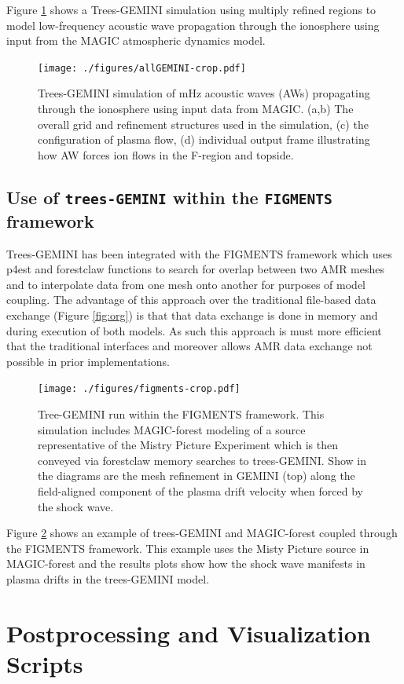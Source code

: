 \documentclass[11pt,letterpaper]{article}
\begin{document}
Figure \ref{fig:Trees-GEMINI} shows a Trees-GEMINI simulation using multiply refined regions to model low-frequency acoustic wave propagation through the ionosphere using input from the MAGIC atmospheric dynamics model.  
\begin{figure}
  \texttt{[image: ./figures/allGEMINI-crop.pdf]}
  \caption{Trees-GEMINI simulation of mHz acoustic waves (AWs) propagating through the ionosphere using input data from MAGIC.  (a,b) The overall grid and refinement structures used in the simulation, (c) the configuration of plasma flow, (d) individual output frame illustrating how AW forces ion flows in the F-region and topside.}
  \label{fig:Trees-GEMINI}
\end{figure}


\subsection{Use of \texttt{trees-GEMINI} within the \texttt{FIGMENTS} framework}

Trees-GEMINI has been integrated with the FIGMENTS framework which uses p4est and forestclaw functions to search for overlap between two AMR meshes and to interpolate data from one mesh onto another for purposes of model coupling.  The advantage of this approach over the traditional file-based data exchange (Figure \ref{fig:org}) is that that data exchange is done in memory and during execution of both models.  As such this approach is must more efficient that the traditional interfaces and moreover allows AMR data exchange not possible in prior implementations.  
\begin{figure}
  \centering
  \texttt{[image: ./figures/figments-crop.pdf]}
  \caption{Tree-GEMINI run within the FIGMENTS framework.  This simulation includes MAGIC-forest modeling of a source representative of the Mistry Picture Experiment which is then conveyed via forestclaw memory searches to trees-GEMINI.  Show in the diagrams are the mesh refinement in GEMINI (top) along the field-aligned component of the plasma drift velocity when forced by the shock wave.}
  \label{fig:FIGMENTS}
\end{figure}

Figure \ref{fig:FIGMENTS} shows an example of trees-GEMINI and MAGIC-forest coupled through the FIGMENTS framework.  This example uses the Misty Picture source in MAGIC-forest and the results plots show how the shock wave manifests in plasma drifts in the trees-GEMINI model.  


\section{Postprocessing and Visualization Scripts}
\end{document}
